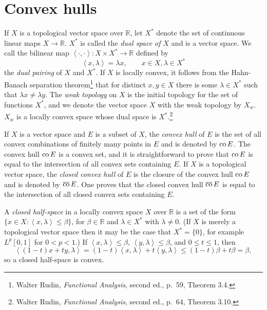 \documentclass{article}
\newcommand{\inner}[2]{\left\langle #1, #2 \right\rangle}
\newcommand{\co}{\ensuremath\mathrm{co}\,}
\newcommand{\cco}{\ensuremath\overline{\mathrm{co}}\,}
\theoremstyle{definition}
\begin{document}
\section{Convex hulls}
If $X$ is a topological vector space over $\mathbb{R}$, let  $X^*$ denote the set of  continuous linear maps
$X \to \mathbb{R}$. $X^*$ is  called the {\em dual space of $X$} and  is  a vector space. 
We call the bilinear map $\inner{\cdot}{\cdot}:X \times X^* \to \mathbb{R}$ defined by 
\[
\inner{x}{\lambda}=\lambda x, \qquad x \in X, \lambda \in X^*
\]
the {\em dual pairing} of $X$ and $X^*$.
If $X$ is locally convex, it follows from the Hahn-Banach separation theorem\footnote{Walter Rudin, {\em Functional Analysis}, second ed., p.~59, Theorem 3.4.} that
for distinct $x,y \in X$ there is some $\lambda \in X^*$ such that $\lambda x \neq \lambda y$.
The {\em weak topology} on $X$ is the initial topology for the set of functions $X^*$, and we denote 
the vector space $X$ with the weak topology by $X_w$. $X_w$ is a locally convex space whose dual space is $X^*$.\footnote{Walter Rudin, {\em Functional Analysis}, second ed., p.~64, Theorem 3.10.}

If $X$ is a vector space and $E$ is a subset of $X$, the {\em convex hull} of $E$ is the set of all convex combinations of finitely many points in $E$ and is denoted
by $\co E$. The convex hull $\co E$ is a convex set, and  it is straightforward to prove that $\co E$ is equal to the intersection of all convex sets containing $E$. 
If $X$ is a topological vector  space, the {\em closed convex hull} of $E$ is the closure of the convex hull $\co E$ and is denoted by $\cco E$. One proves that the closed convex hull $\cco E$ is equal to the intersection of all closed convex sets containing $E$.

A {\em closed half-space} in a locally convex space $X$  over $\mathbb{R}$ is a set of the form $\{ x \in X: \inner{x}{\lambda} \leq \beta\}$, for $\beta \in \mathbb{R}$
and  $\lambda \in X^*$ with $\lambda \neq 0$. (If $X$ is merely a topological vector space then it may be the case that $X^*=\{0\}$, for example $L^p[0,1]$ for $0<p<1$.)
If $\inner{x}{\lambda} \leq \beta$, $\inner{y}{\lambda} \leq \beta$, and $0 \leq t \leq 1$, then 
\[
\inner{(1-t)x+ty}{\lambda} = (1-t)\inner{x}{\lambda}+t\inner{y}{\lambda} \leq (1-t)\beta + t \beta = \beta,
\]
so a closed half-space is convex. 
\end{document}
